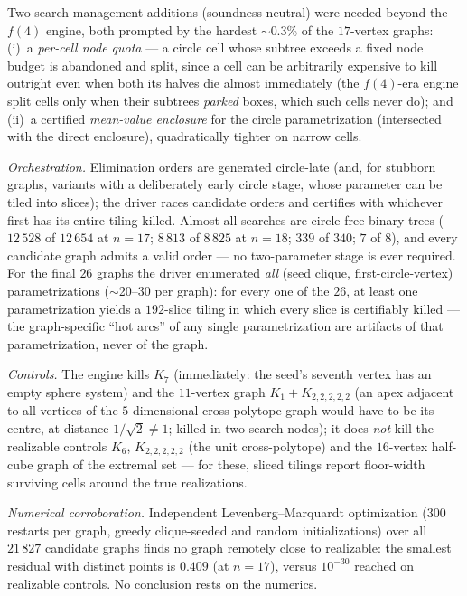 \documentclass[11pt]{article}
\begin{document}
Two search-management additions (soundness-neutral) were needed beyond
the $f(4)$ engine, both prompted by the hardest $\sim$0.3\% of the
$17$-vertex graphs: (i)~a \emph{per-cell node quota} --- a circle cell
whose subtree exceeds a fixed node budget is abandoned and split, since
a cell can be arbitrarily expensive to kill outright even when both its
halves die almost immediately (the $f(4)$-era engine split cells only
when their subtrees \emph{parked} boxes, which such cells never do);
and (ii)~a certified \emph{mean-value enclosure} for the circle
parametrization (intersected with the direct enclosure), quadratically
tighter on narrow cells.

\emph{Orchestration.} Elimination orders are generated circle-late (and,
for stubborn graphs, variants with a deliberately early circle stage,
whose parameter can be tiled into slices); the driver races candidate
orders and certifies with whichever first has its entire tiling killed.
Almost all searches are circle-free binary trees ($12\,528$ of $12\,654$
at $n=17$; $8\,813$ of $8\,825$ at $n=18$; $339$ of $340$; $7$ of $8$),
and every candidate graph admits a valid order --- no two-parameter
stage is ever required. For the final $26$ graphs the driver enumerated
\emph{all} (seed clique, first-circle-vertex) parametrizations
($\sim$20--30 per graph): for every one of the $26$, at least one
parametrization yields a $192$-slice tiling in which every slice is
certifiably killed --- the graph-specific ``hot arcs'' of any single
parametrization are artifacts of that parametrization, never of the
graph.

\emph{Controls.} The engine kills $K_7$ (immediately: the seed's seventh
vertex has an empty sphere system) and the $11$-vertex graph
$K_1+K_{2,2,2,2,2}$ (an apex adjacent to all vertices of the
$5$-dimensional cross-polytope graph would have to be its centre, at
distance $1/\sqrt2\neq1$; killed in two search nodes); it does \emph{not}
kill the realizable controls $K_6$, $K_{2,2,2,2,2}$ (the unit
cross-polytope) and the $16$-vertex half-cube graph of the extremal set
--- for these, sliced tilings report floor-width surviving cells around
the true realizations.

\emph{Numerical corroboration.} Independent Levenberg--Marquardt
optimization ($300$ restarts per graph, greedy clique-seeded and random
initializations) over all $21\,827$ candidate graphs finds no graph
remotely close to realizable: the smallest residual with distinct points
is $0.409$ (at $n=17$), versus $10^{-30}$ reached on realizable controls.
No conclusion rests on the numerics.
\end{document}
